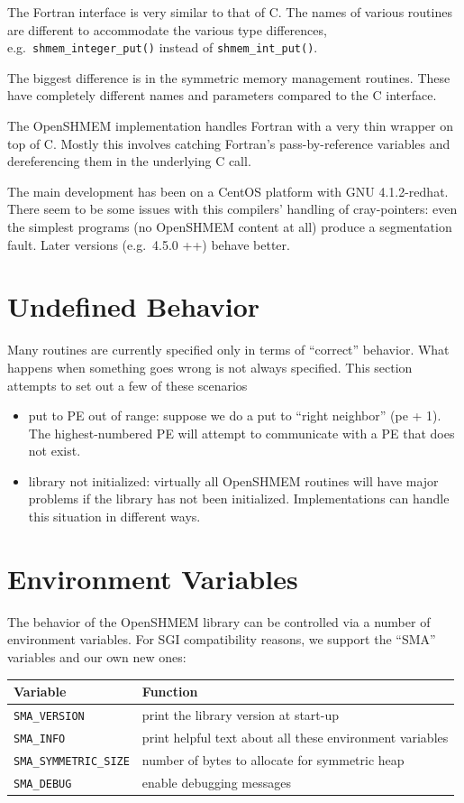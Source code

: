 \documentclass[english]{article}
\providecommand{\tabularnewline}{\\}
\begin{document}
The Fortran interface is very similar to that of C. The names of
various routines are different to accommodate the various type
differences, e.g.\ \texttt{shmem\_integer\_put()} instead of
\texttt{shmem\_int\_put()}.

The biggest difference is in the symmetric memory management routines.
These have completely different names and parameters compared to the C
interface.

The OpenSHMEM implementation handles Fortran with a very thin wrapper
on top of C. Mostly this involves catching Fortran's pass-by-reference
variables and dereferencing them in the underlying C call.

The main development has been on a CentOS platform with GNU
4.1.2-redhat.  There seem to be some issues with this compilers'
handling of cray-pointers: even the simplest programs (no OpenSHMEM
content at all) produce a segmentation fault. Later versions
(e.g.\ 4.5.0 ++) behave better.

\section{Undefined Behavior}

Many routines are currently specified only in terms of ``correct''
behavior. What happens when something goes wrong is not always
specified.  This section attempts to set out a few of these scenarios
\begin{itemize}
\item put to PE out of range: suppose we do a put to ``right
neighbor'' (pe + 1). The highest-numbered PE will attempt to
communicate with a PE that does not exist.
\item library not initialized: virtually all OpenSHMEM routines will
have major problems if the library has not been
initialized. Implementations can handle this situation in different
ways.
\end{itemize}

\section{Environment Variables\label{sec:Environment-Variables}}

The behavior of the OpenSHMEM library can be controlled via a number
of environment variables. For SGI compatibility reasons, we support
the ``SMA'' variables and our own new ones:

\medskip{}

\begin{tabular}{|l|l|}
\hline 
Variable & Function\tabularnewline
\hline
\hline 
\texttt{SMA\_VERSION} & print the library version at start-up\tabularnewline
\hline 
\texttt{SMA\_INFO} & print helpful text about all these environment variables\tabularnewline
\hline 
\texttt{SMA\_SYMMETRIC\_SIZE} & number of bytes to allocate for symmetric heap\tabularnewline
\hline 
\texttt{SMA\_DEBUG} & enable debugging messages\tabularnewline
\hline
\end{tabular}
\end{document}
